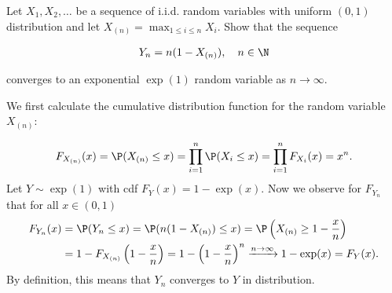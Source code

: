 
\begin{exercise}

Let $X_1,X_2,\dots$ be a sequence of i.i.d. random variables with uniform $(0,1)$
distribution and let $X_{(n)} = \max_{1 \leq i \leq n} X_i$.
Show that the sequence

\begin{align*}
  Y_n = n(1 - X_{(n)}), \quad n \in \N
\end{align*}

converges to an exponential $\exp(1)$ random variable as $n \to \infty$.

\end{exercise}


\begin{solution}

We first calculate the cumulative distribution function for the random variable $X_{(n)}$:

\begin{align*}
  F_{X_{(n)}}(x) = \P(X_{(n)} \leq x) = \prod_{i=1}^n \P(X_i \leq x) = \prod_{i=1}^n F_{X_i}(x)
  = x^n.
\end{align*}
Let $Y \sim \exp(1)$ with cdf $F_Y(x) = 1 - \exp(x)$.
Now we observe for $F_{Y_n}$ that for all $x \in (0,1)$
\begin{align*}
  F_{Y_n}(x) &= \P(Y_n \leq x) = \P(n(1 - X_{(n)}) \leq x)
  = \P\left(X_{(n)} \geq 1 - \frac{x}{n}\right) \\
  &= 1 - F_{X_{(n)}}\left(1 - \frac{x}{n}\right)
  = 1 - \left(1 - \frac{x}{n}\right)^n \xrightarrow{n \to \infty} 1 - \exp(x) = F_Y(x).
\end{align*}
By definition, this means that $Y_n$ converges to $Y$ in distribution.

\end{solution}

